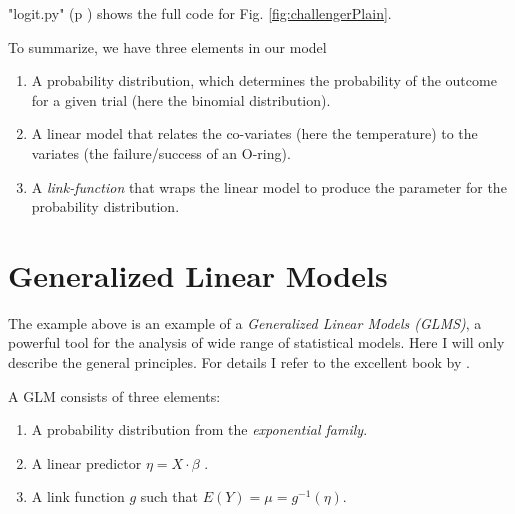 \PyImg "logit.py" (p \pageref{py:logit}) shows the full code for Fig. \ref{fig:challengerPlain}.

\vspace{5 mm}

To summarize, we have three elements in our model

\begin{enumerate}
  \item A probability distribution, which determines the probability of the outcome for a given trial (here the binomial distribution).
  \item A linear model that relates the co-variates (here the temperature) to the variates (the failure/success of an O-ring).
  \item A \emph{link-function} that wraps the linear model to produce the parameter for the probability distribution.
\end{enumerate}


\section{Generalized Linear Models}

The example above is an example of a \emph{Generalized Linear Models (GLMS)}, a powerful tool for the analysis of wide range of statistical models. Here I will only describe the general principles. For details I refer to the excellent book by \cite{Dobson2008}.

A GLM consists of three elements:

\begin{enumerate}
  \item A probability distribution from the \emph{exponential family}.
  \item A linear predictor $\eta = X \cdot \beta$ .
  \item A link function $g$ such that $E(Y) = \mu = g^{-1}(\eta)$.
\end{enumerate}

